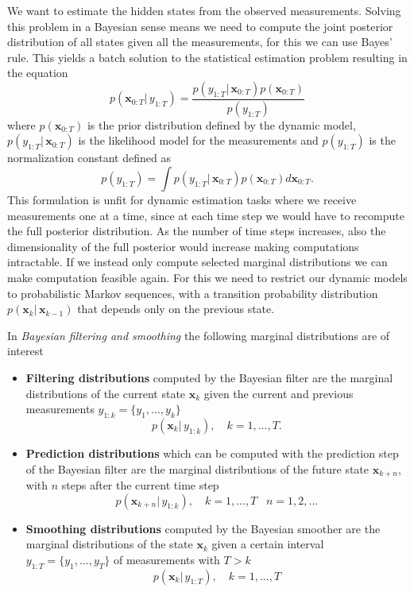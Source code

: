 
We want to estimate the hidden states from the observed
measurements. Solving this problem in a Bayesian
sense means we 
need to compute the joint posterior distribution of all
states given all the measurements, for this we can
use Bayes' rule.
This yields a batch solution to the statistical estimation problem
resulting in the equation
\begin{equation}
  \label{eq:bayes}
  p(\mathbf{x}_{0:T} |\, y_{1:T})
  = \frac{p(y_{1:T} |\, \mathbf{x}_{0:T}) p(\mathbf{x}_{0:T})}
  {p(y_{1:T})}
\end{equation}
where $p(\mathbf{x}_{0:T})$ is the prior distribution defined by the dynamic
model, $p(y_{1:T} |\, \mathbf{x}_{0:T})$ is the likelihood model for the
measurements and $p(y_{1:T})$ is the normalization constant defined as
$$ p(y_{1:T}) = \int p(y_{1:T} |\, \mathbf{x}_{0:T})
p(\mathbf{x}_{0:T}) d \mathbf{x}_{0:T}.$$
This formulation is unfit for dynamic estimation tasks where
we receive measurements one at a time, since
at each time step we would have to
recompute the full posterior distribution. As the number of
time steps increases, also the dimensionality of the full posterior
would increase making computations intractable.
If we instead only compute selected marginal distributions we can
make computation feasible again. For this we need to restrict
our dynamic models to probabilistic Markov sequences, with a
transition probability distribution $p(\mathbf{x}_k |\, \mathbf{x}_{k-1})$
that depends only on the previous state.


In \textit{Bayesian filtering and smoothing} the following marginal
distributions are of interest

\begin{itemize}
\item \textbf{Filtering distributions} computed by the
  Bayesian filter are the marginal distributions of the
  current state $\mathbf{x}_k$ given the current and previous measurements
  $y_{1:k} = \{y_1,...,y_k\}$
  $$ p(\mathbf{x}_k |\, y_{1:k}), \quad k = 1,...,T.$$
\item \textbf{Prediction distributions} which can be computed with
  the prediction step of the Bayesian filter are the marginal
  distributions of the future state $\mathbf{x}_{k+n}$, with $n$ steps
  after the current time step
  $$ p(\mathbf{x}_{k+n} |\, y_{1:k}), \quad k = 1,...,T \;\;\; n = 1,2,...$$
\item \textbf{Smoothing distributions} computed by the Bayesian smoother
  are the marginal distributions of the state $\mathbf{x}_k$ given
  a certain interval $y_{1:T} = \{y_1,...,y_T\}$ of measurements with
  $T > k$
  $$ p(\mathbf{x}_k |\, y_{1:T}), \quad k = 1,...,T$$
\end{itemize}

